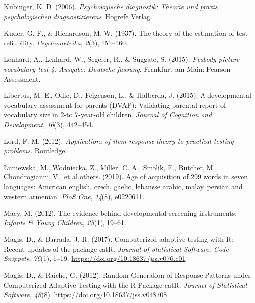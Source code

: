 \documentclass[
  man,floatsintext]{apa6}
\newlength{\cslhangindent}
\newlength{\cslentryspacingunit} %
\newenvironment{CSLReferences}[2] %
 {%
  \setlength{\parindent}{0pt}
  \ifodd #1
  \let\oldpar\par
  \def\par{\hangindent=\cslhangindent\oldpar}
  \fi
  \setlength{\parskip}{#2\cslentryspacingunit}
 }%
 {}
\begin{document}
\begin{CSLReferences}{1}{0}
\leavevmode{}%
Kubinger, K. D. (2006). \emph{Psychologische diagnostik: Theorie und praxis psychologischen diagnostizierens}. Hogrefe Verlag.

\leavevmode{}%
Kuder, G. F., \& Richardson, M. W. (1937). The theory of the estimation of test reliability. \emph{Psychometrika}, \emph{2}(3), 151--160.

\leavevmode{}%
Lenhard, A., Lenhard, W., Segerer, R., \& Suggate, S. (2015). \emph{Peabody picture vocabulary test-4. Ausgabe: Deutsche fassung}. Frankfurt am Main: Pearson Assessment.

\leavevmode{}%
Libertus, M. E., Odic, D., Feigenson, L., \& Halberda, J. (2015). A developmental vocabulary assessment for parents (DVAP): Validating parental report of vocabulary size in 2-to 7-year-old children. \emph{Journal of Cognition and Development}, \emph{16}(3), 442--454.

\leavevmode{}%
Lord, F. M. (2012). \emph{Applications of item response theory to practical testing problems}. Routledge.

\leavevmode{}%
Łuniewska, M., Wodniecka, Z., Miller, C. A., Smolik, F., Butcher, M., Chondrogianni, V., et al.others. (2019). Age of acquisition of 299 words in seven languages: American english, czech, gaelic, lebanese arabic, malay, persian and western armenian. \emph{PloS One}, \emph{14}(8), e0220611.

\leavevmode{}%
Macy, M. (2012). The evidence behind developmental screening instruments. \emph{Infants \& Young Children}, \emph{25}(1), 19--61.

\leavevmode{}%
Magis, D., \& Barrada, J. R. (2017). Computerized adaptive testing with {R}: Recent updates of the package {catR}. \emph{Journal of Statistical Software, Code Snippets}, \emph{76}(1), 1--19. \url{https://doi.org/10.18637/jss.v076.c01}

\leavevmode{}%
Magis, D., \& Raîche, G. (2012). Random Generation of Response Patterns under Computerized Adaptive Testing with the R Package catR. \emph{Journal of Statistical Software}, \emph{48}(8). \url{https://doi.org/10.18637/jss.v048.i08}


\end{CSLReferences}
\end{document}
